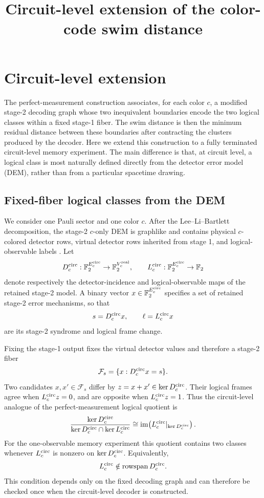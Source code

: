 \documentclass[10pt,twocolumn]{article}
\title{Circuit-level extension of the color-code swim distance}
\author{}
\date{}
\newcommand{\F}{\mathbb F_2}
\begin{document}
\maketitle

\section{Circuit-level extension}
\label{sec:circuit_level_main}

The perfect-measurement construction associates, for each color \(c\), a
modified stage-2 decoding graph whose two inequivalent boundaries encode the
two logical classes within a fixed stage-1 fiber.  The swim distance is then
the minimum residual distance between these boundaries after contracting the
clusters produced by the decoder.  Here we extend this construction to a
fully terminated circuit-level memory experiment.  The main difference is
that, at circuit level, a logical class is most naturally defined directly
from the detector error model (DEM), rather than from a particular spacetime
drawing.

\subsection{Fixed-fiber logical classes from the DEM}

We consider one Pauli sector and one color \(c\).  After the
Lee--Li--Bartlett decomposition, the stage-2 \(c\)-only DEM is graphlike and
contains physical \(c\)-colored detector rows, virtual detector rows inherited
from stage 1, and logical-observable labels \cite{Lee}.  Let
\[
 D_c^{\rm circ}:\F^{E_c^{\rm circ}}\rightarrow\F^{V_c^{\rm real}},
 \qquad
 L_c^{\rm circ}:\F^{E_c^{\rm circ}}\rightarrow\F
\]
denote respectively the detector-incidence and logical-observable maps of the
retained stage-2 model.  A binary vector
\(x\in\F^{E_c^{\rm circ}}\) specifies a set of retained stage-2 error
mechanisms, so that
\[
 s=D_c^{\rm circ}x,\qquad
 \ell=L_c^{\rm circ}x
\]
are its stage-2 syndrome and logical frame change.

Fixing the stage-1 output fixes the virtual detector values and therefore a
stage-2 fiber
\[
 \mathcal F_s=\{x:D_c^{\rm circ}x=s\}.
\]
Two candidates \(x,x'\in\mathcal F_s\) differ by
\(z=x+x'\in\ker D_c^{\rm circ}\).  Their logical frames agree when
\(L_c^{\rm circ}z=0\), and are opposite when
\(L_c^{\rm circ}z=1\).  Thus the circuit-level analogue of the
perfect-measurement logical quotient is
\[
 \frac{\ker D_c^{\rm circ}}
 {\ker D_c^{\rm circ}\cap\ker L_c^{\rm circ}}
 \cong
 \operatorname{im}
 \!\left(
 L_c^{\rm circ}|_{\ker D_c^{\rm circ}}
 \right).
 \label{eq:circ_quotient}
\]
For the one-observable memory experiment this quotient contains two classes
whenever \(L_c^{\rm circ}\) is nonzero on
\(\ker D_c^{\rm circ}\).  Equivalently,
\[
 L_c^{\rm circ}\notin\operatorname{rowspan}D_c^{\rm circ}.
 \label{eq:rank_condition}
\]
This condition depends only on the fixed decoding graph and can therefore be
checked once when the circuit-level decoder is constructed.
\end{document}
